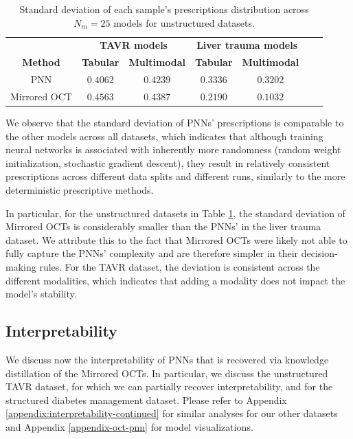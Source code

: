 \documentclass[10pt]{article} %
\begin{document}
\begin{table}[ht]\caption{Standard deviation of each sample's prescriptions distribution across $N_m=25$ models for unstructured datasets.}\label{unstructured-stab}
\begin{center}
\begin{tabular}{ccccccc}
& \multicolumn{2}{c}{\textbf{TAVR models}} & \multicolumn{2}{c}{\textbf{Liver trauma models}} \\ 
\textbf{Method} & \textbf{Tabular} & \textbf{Multimodal} & \textbf{Tabular} & \textbf{Multimodal} \\ \midrule
PNN & $\mathbf{0.4062}$ & $\mathbf{0.4239}$  & $0.3336$ & $0.3202$ \\ 
Mirrored OCT & $0.4563$ & $0.4387$ & $\mathbf{0.2190}$ & $\mathbf{0.1032}$\\
\end{tabular}
\end{center}
\end{table}

We observe that the standard deviation of PNNs' prescriptions is comparable to the other models across all datasets, which indicates that although training neural networks is associated with inherently more randomness (random weight initialization, stochastic gradient descent), they result in relatively consistent prescriptions across different data splits and different runs, similarly to the more deterministic prescriptive methods. 

In particular, for the unstructured datasets in Table \ref{unstructured-stab}, the standard deviation of Mirrored OCTs is considerably smaller than the PNNs' in the liver trauma dataset. We attribute this to the fact that Mirrored OCTs were likely not able to fully capture the PNNs' complexity and are therefore simpler in their decision-making rules. For the TAVR dataset, the deviation is consistent across the different modalities, which indicates that adding a modality does not impact the model's stability.

\subsection{Interpretability}\label{subsec:interpretability}
We discuss now the interpretability of PNNs that is recovered via knowledge distillation of the Mirrored OCTs. In particular, we discuss the unstructured TAVR dataset, for which we can partially recover interpretability, and for the structured diabetes management dataset. Please refer to Appendix \ref{appendix:interpretability-continued} for similar analyses for our other datasets and Appendix \ref{appendix-oct-pnn} for model visualizations. 
\end{document}
